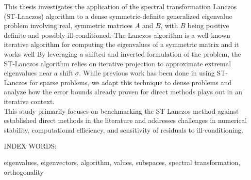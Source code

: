 \begin{flushleft}
	\justify
	This thesis investigates the application of the spectral transformation Lanczos (ST-Lanczos) algorithm to a dense symmetric-definite generalized eigenvalue problem involving real, symmetric matrices $A$ and $B$, with $B$ being positive definite and possibly\del{,} ill-conditioned. The Lanczos algorithm is a well-known iterative algorithm for computing the eigenvalues of a symmetric matrix and it works well  By leveraging a shifted and inverted formulation of the problem, the ST-Lanczos algorithm relies on iterative projection to approximate extremal eigenvalues near a shift $\sigma$.   While previous work has been done in using ST-Lanczos for sparse problems, we adapt this technique to dense problems and analyze how the error bounds already proven for direct methods plays out in an iterative context.  \\[10pt]
	This study primarily focuses on benchmarking the ST-Lanczos method against established direct methods in the literature and addresses challenges in numerical stability, computational efficiency, and sensitivity of residuals to ill-conditioning.
\end{flushleft} 
\begin{singlespace}
\vspace{0.5in}
\noindent INDEX WORDS:
\hspace{0.2in}
\parbox[t]{4.5in}{
  eigenvalues, eigenvectors,  algorithm,  values,  subspaces, spectral transformation, orthogonality}
\end{singlespace} 
